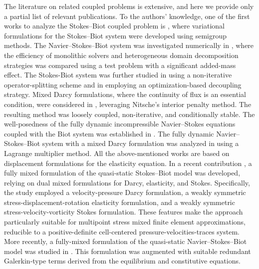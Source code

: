 \documentclass[11pt]{article}
\numberwithin{equation}{section}
\newcommand{\0}{{\mathbf{0}}}
\numberwithin{equation}{section}
\begin{document}
The literature on related coupled problems is extensive, and here we provide only a partial list of relevant publications. 
To the authors' knowledge, one of the first works to analyze the Stokes--Biot coupled problem is \cite{s2005}, where variational formulations for the Stokes--Biot system were developed using semigroup methods. 
The Navier--Stokes--Biot system was investigated numerically in \cite{bqq2009}, where the efficiency of monolithic solvers and heterogeneous domain decomposition strategies was compared using a test problem with a significant added-mass effect.
The Stokes-Biot system was further studied in \cite{byz2015} using a non-iterative operator-splitting scheme and in \cite{clqwy2016} employing an optimization-based decoupling strategy. 
Mixed Darcy formulations, where the continuity of flux is an essential condition, were considered in \cite{byzz2015}, leveraging Nitsche's interior penalty method. 
The resulting method was loosely coupled, non-iterative, and conditionally stable. 
The well-posedness of the fully dynamic incompressible Navier--Stokes equations coupled with the Biot system was established in \cite{Cesmelioglu2017}. 
The fully dynamic Navier--Stokes--Biot system with a mixed Darcy formulation was analyzed in \cite{wy2022} using a Lagrange multiplier method.
All the above-mentioned works are based on displacement formulations for the elasticity equation. 
In a recent contribution \cite{cly2022}, a fully mixed formulation of the quasi-static Stokes--Biot model was developed, relying on dual mixed formulations for Darcy, elasticity, and Stokes. 
Specifically, the study employed a velocity-pressure Darcy formulation, a weakly symmetric stress-displacement-rotation elasticity formulation, and a weakly symmetric stress-velocity-vorticity Stokes formulation. 
These features make the approach particularly suitable for multipoint stress mixed finite element approximations, reducible to a positive-definite cell-centered pressure-velocities-traces system.
More recently, a fully-mixed formulation of the quasi-static Navier--Stokes--Biot model was studied in \cite{lcy2022}. 
This formulation was augmented with suitable redundant Galerkin-type terms derived from the equilibrium and constitutive equations.
\end{document}
